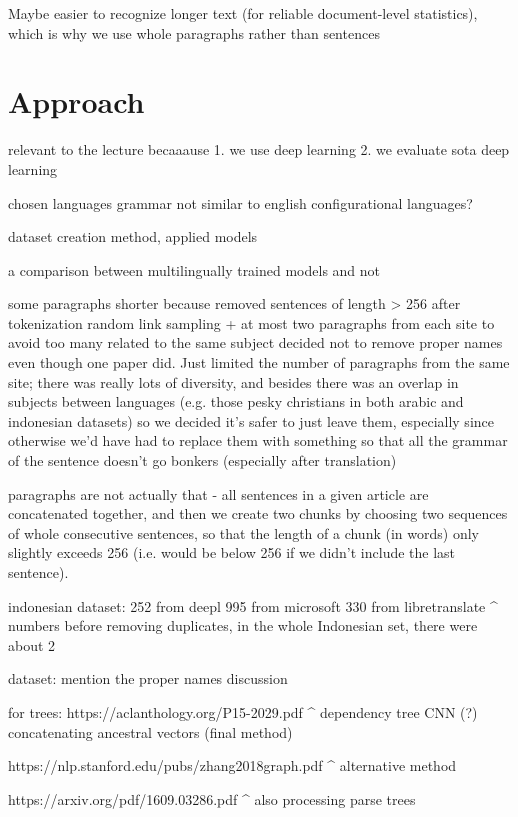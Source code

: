 \documentclass[twocolumn]{article}
\begin{document}
Maybe easier to recognize longer text (for reliable document-level statistics), which is why we use whole paragraphs rather than sentences




\section*{Approach}

relevant to the lecture becaaause 1. we use deep learning 2. we evaluate sota deep learning

chosen languages
grammar not similar to english
configurational languages?

dataset creation method, applied models

a comparison between multilingually trained models and not

some paragraphs shorter because removed sentences of length > 256 after tokenization
random link sampling + at most two paragraphs from each site to avoid too many related to the same subject
decided not to remove proper names even though one paper did. Just limited the number of paragraphs from the same site; there was really lots of diversity, and besides there was an overlap in subjects between languages (e.g. those pesky christians in both arabic and indonesian datasets) so we decided it's safer to just leave them, especially since otherwise we'd have had to replace them with something so that all the grammar of the sentence doesn't go bonkers (especially after translation)

paragraphs are not actually that - all sentences in a given article are concatenated together, and then we create two chunks by choosing two sequences of whole consecutive sentences, so that the length of a chunk (in words) only slightly exceeds 256 (i.e. would be below 256 if we didn't include the last sentence).

indonesian dataset:
252 from deepl
995 from  microsoft
330 from  libretranslate
^ numbers before removing duplicates, in the whole Indonesian set, there were about 2%

dataset: mention the proper names discussion

for trees:
https://aclanthology.org/P15-2029.pdf
^ dependency tree CNN (?) concatenating ancestral vectors (final method)

https://nlp.stanford.edu/pubs/zhang2018graph.pdf
^ alternative method


https://arxiv.org/pdf/1609.03286.pdf
^ also processing parse trees
\end{document}
